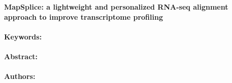\noindent
\large {\bf MapSplice: a lightweight and personalized RNA-seq alignment approach to improve transcriptome profiling} 


\normalsize 


\noindent \paragraph{Keywords:} 

\noindent \paragraph{Abstract:} 



\noindent \paragraph{Authors:} 

